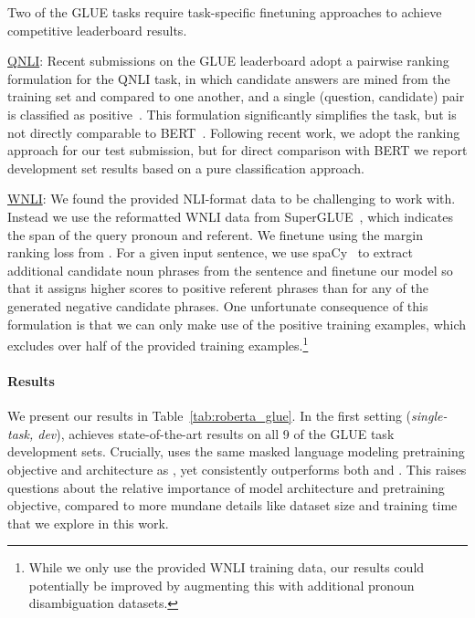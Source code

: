 Two of the GLUE tasks require task-specific finetuning approaches to achieve competitive leaderboard results.

\underline{QNLI}:
Recent submissions on the GLUE leaderboard adopt a pairwise ranking formulation for the QNLI task, in which candidate answers are mined from the training set and compared to one another, and a single (question, candidate) pair is classified as positive~\cite{liu2019mtdnn,liu2019improving,yang2019xlnet}.
This formulation significantly simplifies the task, but is not directly comparable to BERT~\cite{devlin2018bert}.
Following recent work, we adopt the ranking approach for our test submission, but for direct comparison with BERT we report development set results based on a pure classification approach.

\underline{WNLI}: We found the provided NLI-format data to be challenging to work with.
Instead we use the reformatted WNLI data from SuperGLUE~\cite{wang2019superglue}, which indicates the span of the query pronoun and referent.
We finetune \ourmodel{} using the margin ranking loss from .
For a given input sentence, we use spaCy~\cite{spacy2} to extract additional candidate noun phrases from the sentence and finetune our model so that it assigns higher scores to positive referent phrases than for any of the generated negative candidate phrases.
One unfortunate consequence of this formulation is that we can only make use of the positive training examples, which excludes over half of the provided training examples.\footnote{While we only use the provided WNLI training data, our results could potentially be improved by augmenting this with additional pronoun disambiguation datasets.}

\paragraph{Results}

We present our results in Table~\ref{tab:roberta_glue}.
In the first setting (\emph{single-task, dev}), \ourmodel{} achieves state-of-the-art results on all 9 of the GLUE task development sets.
Crucially, \ourmodel{} uses the same masked language modeling pretraining objective and architecture as \bertlarge{}, yet consistently outperforms both \bertlarge{} and \xlnetlarge{}.
This raises questions about the relative importance of model architecture and pretraining objective, compared to more mundane details like dataset size and training time that we explore in this work.


